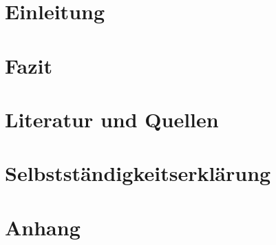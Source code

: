 \documentclass[12pt]{article}
\author{Christoph Derszteler}
\begin{document}
  
  \newpage

  \tableofcontents
  \newpage

  \section{Einleitung}\label{sec:introduction}
  \newpage

  

  \section{Fazit}\label{sec:conclusion}
  \newpage

  \section{Literatur und Quellen}\label{sec:literature-and-sources}
  \newpage

  \section{Selbstständigkeitserklärung}\label{sec:declration-of-independence}
  \newpage

  \section{Anhang}\label{sec:appendix}
  \newpage
\end{document}
